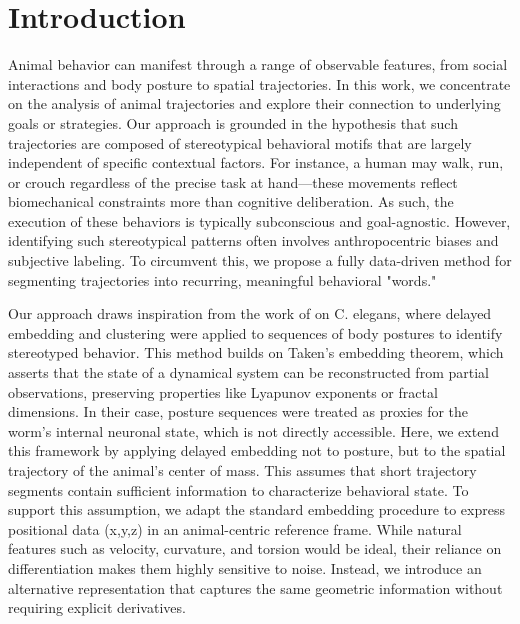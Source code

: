 \section{Introduction}

Animal behavior can manifest through a range of observable features, from social interactions and body posture to spatial trajectories. In this work, we concentrate on the analysis of animal trajectories and explore their connection to underlying goals or strategies. Our approach is grounded in the hypothesis that such trajectories are composed of stereotypical behavioral motifs that are largely independent of specific contextual factors. For instance, a human may walk, run, or crouch regardless of the precise task at hand—these movements reflect biomechanical constraints more than cognitive deliberation. As such, the execution of these behaviors is typically subconscious and goal-agnostic. However, identifying such stereotypical patterns often involves anthropocentric biases and subjective labeling. To circumvent this, we propose a fully data-driven method for segmenting trajectories into recurring, meaningful behavioral "words."

Our approach draws inspiration from the work of \cite{costaMarkovianDynamicsCaenorhabditis2024} on C. elegans, where delayed embedding and clustering were applied to sequences of body postures to identify stereotyped behavior. This method builds on Taken's embedding theorem, which asserts that the state of a dynamical system can be reconstructed from partial observations, preserving properties like Lyapunov exponents or fractal dimensions. In their case, posture sequences were treated as proxies for the worm's internal neuronal state, which is not directly accessible. Here, we extend this framework by applying delayed embedding not to posture, but to the spatial trajectory of the animal's center of mass. This assumes that short trajectory segments contain sufficient information to characterize behavioral state. To support this assumption, we adapt the standard embedding procedure to express positional data (x,y,z) in an animal-centric reference frame. While natural features such as velocity, curvature, and torsion would be ideal, their reliance on differentiation makes them highly sensitive to noise. Instead, we introduce an alternative representation that captures the same geometric information without requiring explicit derivatives.









